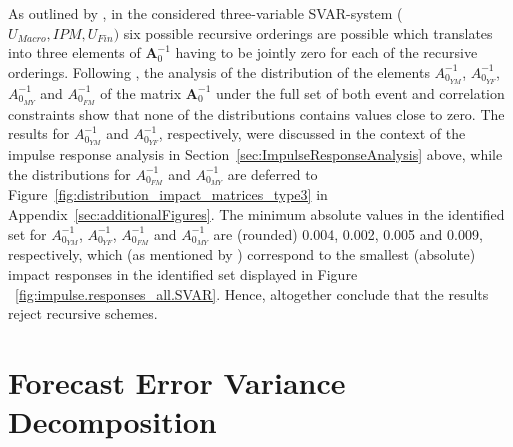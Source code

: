 \documentclass[a4paper,11pt,listof=nochaptergap,oneside,pointednumbers,bibtotoc,bigheadings,liststotoc,hidelinks]{scrbook}
\theoremstyle{mysatz}
\theoremstyle{mydefinition}
\theoremstyle{mytheorem}
\theoremstyle{mybemerkung}
\newcommand{\vect}[1]{\boldsymbol{\mathbf{#1}}}
\begin{document}
As outlined by \citet{ludvigsonetal:19}, in the considered three-variable SVAR-system ($U_{Macro}, IPM, U_{Fin})$ six possible recursive orderings are possible which translates into three elements of $\vect{A}_0^{-1}$ having to be jointly zero for each of the recursive orderings. Following \citet{ludvigsonetal:19}, the analysis of the distribution of the elements $A_{0_{YM}}^{-1}$, $A_{0_{YF}}^{-1}$, $A_{0_{MY}}^{-1}$ and $A_{0_{FM}}^{-1}$ of the matrix $\vect{A}_0^{-1}$ under the full set of both event and correlation constraints show that none of the distributions contains values close to zero. The results for $A_{0_{YM}}^{-1}$ and $A_{0_{YF}}^{-1}$, respectively, were discussed in the context of the impulse response analysis in Section~\ref{sec:ImpulseResponseAnalysis} above, while the distributions for $A_{0_{FM}}^{-1}$ and $A_{0_{MY}}^{-1}$ are deferred to Figure~\ref{fig:distribution_impact_matrices_type3} in Appendix~\ref{sec:additionalFigures}. The minimum absolute values in the identified set for $A_{0_{YM}}^{-1}$, $A_{0_{YF}}^{-1}$, $A_{0_{FM}}^{-1}$ and $A_{0_{MY}}^{-1}$ are (rounded) 0.004, 0.002, 0.005 and 0.009, respectively, which (as mentioned by \citealp{ludvigsonetal:19}) correspond to the smallest (absolute) impact responses in the identified set displayed in Figure ~\ref{fig:impulse.responses_all.SVAR}. Hence, altogether \citet{ludvigsonetal:19} conclude that the results reject recursive schemes.

\section[Forecast Error Variance Decomposition]{Forecast Error Variance Decomposition}
\label{sec:FEVD}
\end{document}
